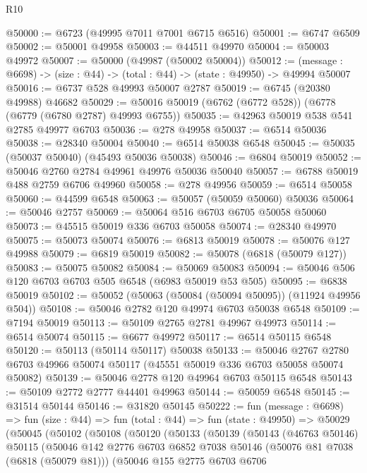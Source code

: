 \begin{lexlean}{R10}
\begin{coremodule}
@50000 := @6723 (@49995 @7011 @7001 @6715 @6516)
@50001 := @6747 @6509
@50002 := @50001 @49958
@50003 := @44511 @49970
@50004 := @50003 @49972
@50007 := @50000 (@49987 (@50002 @50004))
@50012 := (message : @6698) -> (size : @44) -> (total : @44) -> (state : @49950) -> @49994 @50007
@50016 := @6737 @528 @49993 @50007 @2787
@50019 := @6745 (@20380 @49988) @46682
@50029 := @50016 @50019 (@6762 (@6772 @528)) (@6778 (@6779 (@6780 @2787) @49993 @6755))
@50035 := @42963 @50019 @538 @541 @2785 @49977 @6703
@50036 := @278 @49958
@50037 := @6514 @50036
@50038 := @28340 @50004
@50040 := @6514 @50038 @6548
@50045 := @50035 (@50037 @50040) (@45493 @50036 @50038)
@50046 := @6804 @50019
@50052 := @50046 @2760 @2784 @49961 @49976 @50036 @50040
@50057 := @6788 @50019 @488 @2759 @6706 @49960
@50058 := @278 @49956
@50059 := @6514 @50058
@50060 := @44599 @6548
@50063 := @50057 (@50059 @50060) @50036
@50064 := @50046 @2757
@50069 := @50064 @516 @6703 @6705 @50058 @50060
@50073 := @45515 @50019 @336 @6703 @50058
@50074 := @28340 @49970
@50075 := @50073 @50074
@50076 := @6813 @50019
@50078 := @50076 @127 @49988
@50079 := @6819 @50019
@50082 := @50078 (@6818 (@50079 @127))
@50083 := @50075 @50082
@50084 := @50069 @50083
@50094 := @50046 @506 @120 @6703 @6703 @505 @6548 (@6983 @50019 @53 @505)
@50095 := @6838 @50019
@50102 := @50052 (@50063 (@50084 (@50094 @50095)) (@11924 @49956 @504))
@50108 := @50046 @2782 @120 @49974 @6703 @50038 @6548
@50109 := @7194 @50019
@50113 := @50109 @2765 @2781 @49967 @49973
@50114 := @6514 @50074
@50115 := @6677 @49972
@50117 := @6514 @50115 @6548
@50120 := @50113 (@50114 @50117) @50038
@50133 := @50046
    @2767
    @2780
    @6703
    @49966
    @50074
    @50117
    (@45551 @50019 @336 @6703 @50058 @50074 @50082)
@50139 := @50046 @2778 @120 @49964 @6703 @50115 @6548
@50143 := @50109 @2772 @2777 @44401 @49963
@50144 := @50059 @6548
@50145 := @31514 @50144
@50146 := @31820 @50145
@50222 := fun (message : @6698) =>
  fun (size : @44) =>
  fun (total : @44) =>
  fun (state : @49950) =>
  @50029
    (@50045
      (@50102
        (@50108
          (@50120
            (@50133
              (@50139
                (@50143
                  (@46763 @50146)
                  @50115
                  (@50046
                    @142
                    @2776
                    @6703
                    @6852
                    @7038
                    @50146
                    (@50076 @81 @7038 (@6818 (@50079 @81)))
                    (@50046
                      @155
                      @2775
                      @6703
                      @6706

\end{coremodule}
\end{lexlean}

